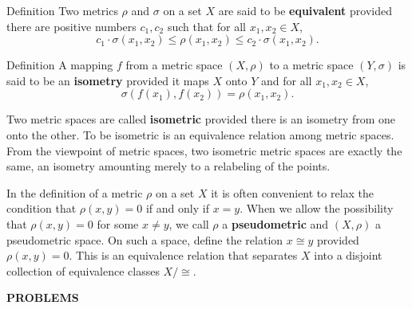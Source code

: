 \begin{flushleft}
\begin{namedthm*}{Definition}
    Two metrics $\rho$ and $\sigma$ on a set $X$ are said to be \textbf{equivalent} provided there are positive numbers $c_1,c_2$ such that for all $x_1,x_2\in X$,
    \[
    c_1\cdot \sigma(x_1,x_2)\le\rho(x_1,x_2)\le c_2\cdot\sigma(x_1,x_2).    
    \]    
\end{namedthm*}

\begin{namedthm*}{Definition}
    A mapping $f$ from a metric space $(X,\rho)$ to a metric space $(Y,\sigma)$ is said to be an \textbf{isometry} provided it maps $X$ onto $Y$ and for all $x_1,x_2\in X$,
    \[
    \sigma(f(x_1),f(x_2))=\rho(x_1,x_2).    
    \]
\end{namedthm*}

Two metric spaces are called \textbf{isometric} provided there is an isometry from one onto the other.
To be isometric is an equivalence relation among metric spaces.
From the viewpoint of metric spaces, two isometric metric spaces are exactly the same, an isometry amounting merely to a relabeling of the points.
\par\medskip
In the definition of a metric $\rho$ on a set $X$ it is often convenient to relax the condition that $\rho(x,y)=0$ if and only if $x=y$.
When we allow the possibility that $\rho(x,y)=0$ for some $x\neq y$, we call $\rho$ a \textbf{pseudometric} and $(X,\rho)$ a pseudometric space.
On such a space, define the relation $x\cong y$ provided $\rho(x,y)=0$.
This is an equivalence relation that separates $X$ into a disjoint collection of equivalence classes $X/\cong$.  

\end{flushleft}
\begin{center}
	\textbf{PROBLEMS}
\end{center}
